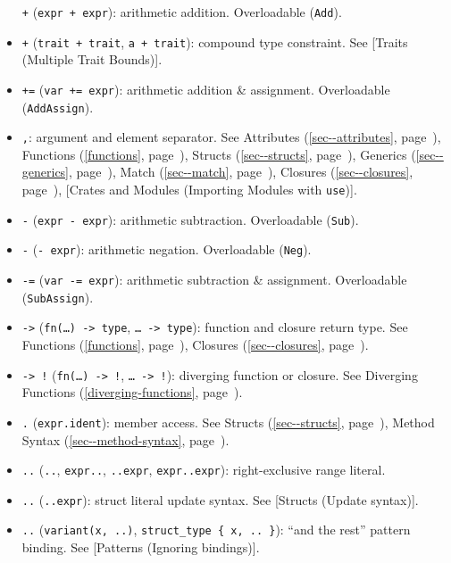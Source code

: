 \documentclass[a4paper,]{book}
\renewcommand*{\hyperlink}[2]{%
 #2 (\autoref{#1}, page~\pageref{#1})}
\begin{document}
\begin{itemize}
  \texttt{+} (\texttt{expr\ +\ expr}): arithmetic addition. Overloadable
  (\texttt{Add}).
\item
  \texttt{+} (\texttt{trait\ +\ trait},
  \texttt{\textquotesingle{}a\ +\ trait}): compound type constraint. See
  {[}Traits (Multiple Trait Bounds){]}.
\item
  \texttt{+=} (\texttt{var\ +=\ expr}): arithmetic addition \&
  assignment. Overloadable (\texttt{AddAssign}).
\item
  \texttt{,}: argument and element separator. See
  \protect\hyperlink{sec--attributes}{Attributes},
  \protect\hyperlink{functions}{Functions},
  \protect\hyperlink{sec--structs}{Structs},
  \protect\hyperlink{sec--generics}{Generics},
  \protect\hyperlink{sec--match}{Match},
  \protect\hyperlink{sec--closures}{Closures}, {[}Crates and Modules
  (Importing Modules with \texttt{use}){]}.
\item
  \texttt{-} (\texttt{expr\ -\ expr}): arithmetic subtraction.
  Overloadable (\texttt{Sub}).
\item
  \texttt{-} (\texttt{-\ expr}): arithmetic negation. Overloadable
  (\texttt{Neg}).
\item
  \texttt{-=} (\texttt{var\ -=\ expr}): arithmetic subtraction \&
  assignment. Overloadable (\texttt{SubAssign}).
\item
  \texttt{-\textgreater{}}
  (\texttt{fn(\ldots{})\ -\textgreater{}\ type},
  \texttt{\textbar{}\ldots{}\textbar{}\ -\textgreater{}\ type}):
  function and closure return type. See
  \protect\hyperlink{functions}{Functions},
  \protect\hyperlink{sec--closures}{Closures}.
\item
  \texttt{-\textgreater{}\ !}
  (\texttt{fn(\ldots{})\ -\textgreater{}\ !},
  \texttt{\textbar{}\ldots{}\textbar{}\ -\textgreater{}\ !}): diverging
  function or closure. See
  \protect\hyperlink{diverging-functions}{Diverging Functions}.
\item
  \texttt{.} (\texttt{expr.ident}): member access. See
  \protect\hyperlink{sec--structs}{Structs},
  \protect\hyperlink{sec--method-syntax}{Method Syntax}.
\item
  \texttt{..} (\texttt{..}, \texttt{expr..}, \texttt{..expr},
  \texttt{expr..expr}): right-exclusive range literal.
\item
  \texttt{..} (\texttt{..expr}): struct literal update syntax. See
  {[}Structs (Update syntax){]}.
\item
  \texttt{..} (\texttt{variant(x,\ ..)},
  \texttt{struct\_type\ \{\ x,\ ..\ \}}): ``and the rest'' pattern
  binding. See {[}Patterns (Ignoring bindings){]}.

\end{itemize}
\end{document}

